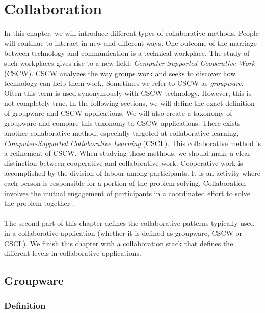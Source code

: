 \chapter{Collaboration}

In this chapter, we will introduce different types of collaborative methods. People will continue to interact in new and different ways. One outcome of the marriage between technology and communication is a technical workplace. The study of such workplaces gives rise to a new field: \textit{Computer-Supported Cooperative Work} (CSCW). CSCW analyzes the way groups work and seeks to discover how technology can help them work. Sometimes we refer to CSCW as \textit{groupware}. Often this term is used synonymously with CSCW technology. However, this is not completely true. In the following sections, we will define the exact definition of groupware and CSCW applications. We will also create a taxonomy of groupware and compare this taxonomy to CSCW applications. There exists another collaborative method, especially targeted at collaborative learning, \textit{Computer-Supported Collaborative Learning} (CSCL). This collaborative method is a refinement of CSCW. When studying these methods, we should make a clear distinction between cooperative and collaborative work. Cooperative work is accomplished by the division of labour among participants. It is an activity where each person is responsible for a portion of the problem solving. Collaboration involves the mutual engagement of participants in a coordinated effort to solve the problem together \cite{DivisionCSCL}.
\\ \\
The second part of this chapter defines the collaborative patterns typically used in a collaborative application (whether it is defined as groupware, CSCW or CSCL). We finish this chapter with a collaboration stack that defines the different levels in collaborative applications.

\section{Groupware}

\subsection{Definition}

